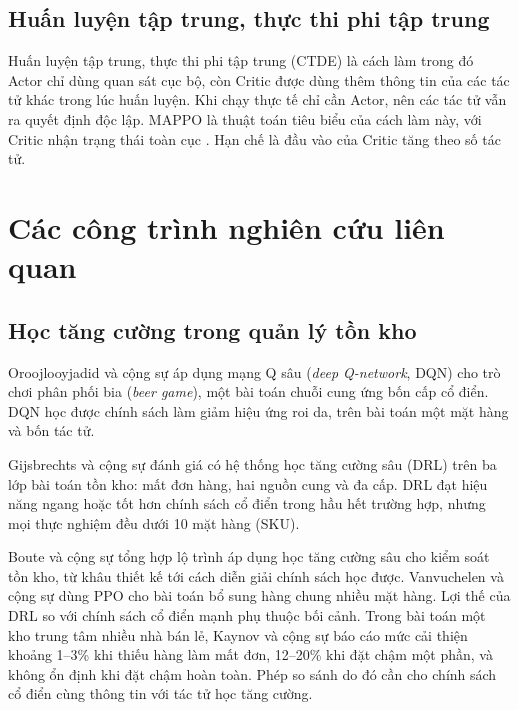 \subsection{Huấn luyện tập trung, thực thi phi tập trung}
\label{subsec:ctde}

Huấn luyện tập trung, thực thi phi tập trung (CTDE) là cách làm trong đó Actor chỉ dùng quan sát cục bộ, còn Critic được dùng thêm thông tin của các tác tử khác trong lúc huấn luyện. Khi chạy thực tế chỉ cần Actor, nên các tác tử vẫn ra quyết định độc lập. MAPPO là thuật toán tiêu biểu của cách làm này, với Critic nhận trạng thái toàn cục \parencite{yu2022mappo}. Hạn chế là đầu vào của Critic tăng theo số tác tử.

\section{Các công trình nghiên cứu liên quan}
\label{sec:congTrinh}

\subsection{Học tăng cường trong quản lý tồn kho}
\label{subsec:rlTonKho}

Oroojlooyjadid và cộng sự \cite{oroojlooyjadid2022} áp dụng mạng Q sâu (\textit{deep Q-network}, DQN) cho trò chơi phân phối bia (\textit{beer game}), một bài toán chuỗi cung ứng bốn cấp cổ điển. DQN học được chính sách làm giảm hiệu ứng roi da, trên bài toán một mặt hàng và bốn tác tử.

Gijsbrechts và cộng sự \cite{gijsbrechts2022} đánh giá có hệ thống học tăng cường sâu (DRL) trên ba lớp bài toán tồn kho: mất đơn hàng, hai nguồn cung và đa cấp. DRL đạt hiệu năng ngang hoặc tốt hơn chính sách cổ điển trong hầu hết trường hợp, nhưng mọi thực nghiệm đều dưới 10 mặt hàng (SKU).

Boute và cộng sự \cite{boute2022} tổng hợp lộ trình áp dụng học tăng cường sâu cho kiểm soát tồn kho, từ khâu thiết kế tới cách diễn giải chính sách học được. Vanvuchelen và cộng sự \cite{vanvuchelen2020} dùng PPO cho bài toán bổ sung hàng chung nhiều mặt hàng. Lợi thế của DRL so với chính sách cổ điển mạnh phụ thuộc bối cảnh. Trong bài toán một kho trung tâm nhiều nhà bán lẻ, Kaynov và cộng sự \cite{kaynov2024} báo cáo mức cải thiện khoảng 1--3\% khi thiếu hàng làm mất đơn, 12--20\% khi đặt chậm một phần, và không ổn định khi đặt chậm hoàn toàn. Phép so sánh do đó cần cho chính sách cổ điển cùng thông tin với tác tử học tăng cường.

